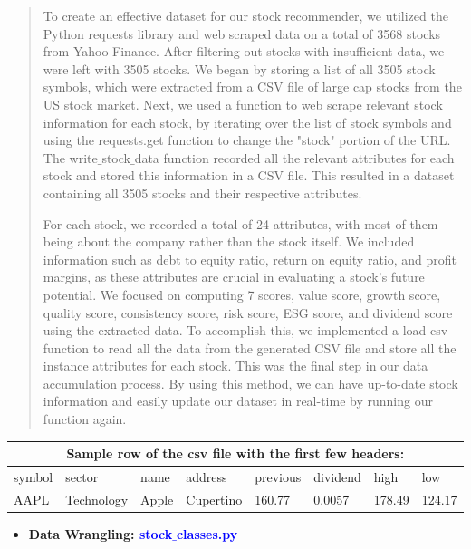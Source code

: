\documentclass[fontsize=12pt]{article}
\begin{document}
\begin{quote}
\noindent To create an effective dataset for our stock recommender, we utilized the Python requests library and web scraped data on a total of 3568 stocks from Yahoo Finance. After filtering out stocks with insufficient data, we were left with 3505 stocks. We began by storing a list of all 3505 stock symbols, which were extracted from a CSV file of large cap stocks from the US stock market. Next, we used a function to web scrape relevant stock information for each stock, by iterating over the list of stock symbols and using the requests.get function to change the "stock" portion of the URL. The write$\_$stock$\_$data function recorded all the relevant attributes for each stock and stored this information in a CSV file. This resulted in a dataset containing all 3505 stocks and their respective attributes.

For each stock, we recorded a total of 24 attributes, with most of them being about the company rather than the stock itself. We included information such as debt to equity ratio, return on equity ratio, and profit margins, as these attributes are crucial in evaluating a stock's future potential. We focused on computing 7 scores, value score, growth score, quality score, consistency score, risk score, ESG score, and dividend score using the extracted data. To accomplish this, we implemented a load csv function to read all the data from the generated CSV file and store all the instance attributes for each stock. This was the final step in our data accumulation process. By using this method, we can have up-to-date stock information and easily update our dataset in real-time by running our function again.
\end{quote}
\begin{center}
\begin{tabular}{|p{1.5cm}|p{1.5cm}|p{1.5cm}|p{1.5cm}|p{1.5cm}|p{1.5cm}|p{1.5cm}|p{1.5cm}|}
 \hline
 \multicolumn{8}{|c|}{Sample row of the csv file with the first few headers:} \\
 \hline
symbol & sector & name & address & previous & dividend & high & low\\
 \hline
AAPL & Technology & Apple & Cupertino & 160.77 & 0.0057 & 178.49 & 124.17\\
 \hline
\end{tabular}
\end{center}
\begin{itemize}
\item
  
  \textbf{Data Wrangling: \textcolor{blue}{stock$\_$classes.py}}
 
\end{itemize}
\end{document}
